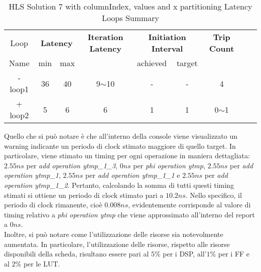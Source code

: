 \begin{table}[H]
	\centering
	\begin{tabular}{|c|c|c|c|c|c|c|c|c|}
		\hline
		\multicolumn{1}{|c|}{Loop} & \multicolumn{2}{|c|}{\textbf{Latency}} & \multicolumn{1}{c|}{\textbf{Iteration Latency}} & \multicolumn{2}{c|}{\textbf{Initiation Interval}} & \multicolumn{1}{c|}{\textbf{Trip Count}}  \\
		Name & min & max &  & achieved & target &  \\
		\hline
		- loop1 & 36 & 40 & 9$\sim$10 & - & - & 4 \\
		+ loop2 & 5 & 6 & 6 & 1 & 1 & 0$\sim$1 \\
		\hline
	\end{tabular}
	\caption{HLS Solution 7 with columnIndex, values and x partitioning Latency Loops Summary}
	\label{tab:hls-solution-7-columnindex-values-x-partitioning-loop-summary}
\end{table}

Quello che si può notare è che all'interno della console viene visualizzato un warning indicante un periodo di clock stimato maggiore di quello target. In particolare, viene stimato un timing per ogni operazione in maniera dettagliata: $2.55 ns$ per \textit{add operation ytmp\_1\_3}, $0 ns$ per \textit{phi operation ytmp}, $2.55 ns$ per \textit{add operation ytmp\_1}, $2.55 ns$ per \textit{add operation ytmp\_1\_1} e $2.55 ns$ per \textit{add operation ytmp\_1\_2}. Pertanto, calcolando la somma di tutti questi timing stimati si ottiene un periodo di clock stimato pari a $10.2 ns$. Nello specifico, il periodo di clock rimanente, cioè $0.008 ns$, evidentemente corrisponde al valore di timing relativo a \textit{phi operation ytmp} che viene approssimato all'interno del report a $0 ns$. 
\\
Inoltre, si può notare come l'utilizzazione delle risorse sia notevolmente aumentata. In particolare, l'utilizzazione delle risorse, rispetto alle risorse disponibili della scheda, risultano essere pari al $5\%$ per i DSP, all'$1\%$ per i FF e al $2\%$ per le LUT.

